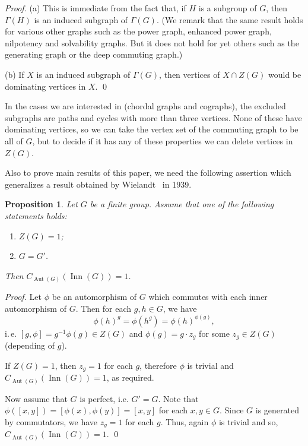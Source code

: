 \documentclass{elsarticle}
\newtheorem{prop}[theorem]{Proposition}
\newcommand{\Aut}{\mathop{\mathrm{Aut}}}
\newcommand{\Inn}{\mathop{\mathrm{Inn}}}
\begin{document}
\begin{proof}
(a) This is immediate from the fact that, if $H$ is a subgroup of $G$, then
$\Gamma(H)$ is an induced subgraph of $\Gamma(G)$. (We remark that the same
result holds for various other graphs such as the power graph, enhanced power
graph, nilpotency and solvability graphs. But it does not hold for yet others
such as the generating graph or the deep commuting graph.)

\smallskip

(b) If $X$ is an induced subgraph of $\Gamma(G)$, then vertices of
$X\cap Z(G)$ would be dominating vertices in $X$. \qed
\end{proof}

In the cases we are interested in (chordal graphs and
cographs), the excluded subgraphs are paths and cycles with more than three
vertices. None of these have dominating vertices, so we can take the
vertex set of the commuting graph to be all of $G$, but to decide if it has
any of these properties we can delete vertices in $Z(G)$.

\medskip

Also to prove main results of this paper, we need the following
assertion which generalizes a result obtained by
Wielandt~\cite{wielandt} in 1939.

\begin{prop}\label{Wielandt} Let $G$ be a finite group. Assume that one of the following statements holds:
\begin{enumerate}
\item $Z(G)=1$;
\item $G=G'$.
\end{enumerate}
Then $C_{\Aut(G)}(\Inn(G))=1$.
\end{prop}

\begin{proof}

  Let $\phi$ be an automorphism of $G$ which commutes with each inner
  automorphism of $G$. Then for each $g, h \in G$, we
  have $$\phi(h)^g=\phi(h^g)=\phi(h)^{\phi(g)},$$
  i.\,e. $[g,\phi]=g^{-1}\phi(g) \in Z(G)$ and $\phi(g)=g\cdot z_g$
  for some $z_g \in Z(G)$ (depending of $g$).

If $Z(G)=1$, then $z_g=1$ for each $g$, therefore $\phi$ is trivial and $C_{\Aut(G)}(\Inn(G))=1$, as required.

Now assume that $G$ is perfect, i.e. $G'=G$. Note that $\phi([x,y])=[\phi(x),\phi(y)]=[x,y]$ for each $x, y \in G$. Since $G$ is generated by commutators, we have $z_g=1$ for each $g$. Thus, again $\phi$ is trivial and so, $C_{\Aut(G)}(\Inn(G))=1$. \qed
\end{proof}
\end{document}
